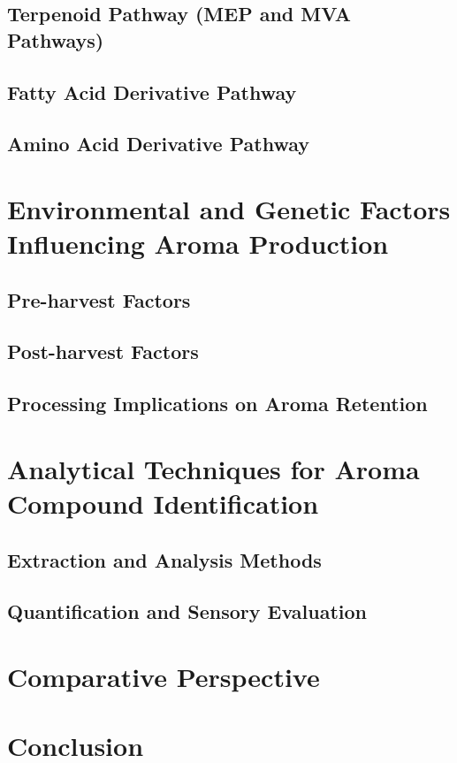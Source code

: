 \subsection{Terpenoid Pathway (MEP and MVA Pathways)}
\subsection{Fatty Acid Derivative Pathway}
\subsection{Amino Acid Derivative Pathway}


\section{Environmental and Genetic Factors Influencing Aroma Production}
\subsection{Pre-harvest Factors}
\subsection{Post-harvest Factors}
\subsection{Processing Implications on Aroma Retention}


\section{Analytical Techniques for Aroma Compound Identification}
\subsection{Extraction and Analysis Methods}
\subsection{Quantification and Sensory Evaluation}

\section{Comparative Perspective}

\section{Conclusion}
